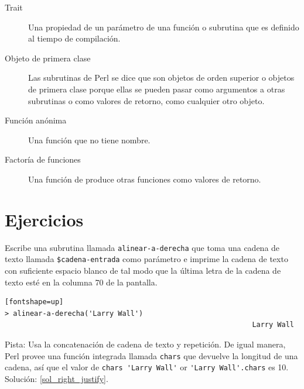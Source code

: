 \begin{description}
\item[Trait] Una propiedad de un parámetro de una función
o subrutina que es definido al tiempo de compilación.

\item[Objeto de primera clase] Las subrutinas de Perl se
dice que son objetos de orden superior o objetos de primera 
clase porque ellas se pueden pasar como argumentos a 
otras subrutinas o como valores de retorno, como cualquier
otro objeto.

\item[Función anónima] Una función que no tiene nombre.

\item[Factoría de funciones] Una función de produce otras 
funciones como valores de retorno.

\end{description}


\section{Ejercicios}

\begin{exercise}
\label{right_justify}

Escribe una subrutina llamada \verb|alinear-a-derecha| 
que toma una cadena de texto llamada {\tt \$cadena-entrada}
como parámetro e imprime la cadena de texto con suficiente
espacio blanco de tal modo que la última letra de la cadena
de texto esté en la columna 70 de la pantalla.

\begin{verbatim}[fontshape=up]
> alinear-a-derecha('Larry Wall')
                                                           Larry Wall
\end{verbatim}

Pista: Usa la concatenación de cadena de texto y repetición. 
De igual manera, Perl provee una función integrada llamada 
{\tt chars} que devuelve la longitud de una cadena, así que
el valor de \verb"chars 'Larry Wall'" or \verb"'Larry Wall'.chars"
es 10. Solución: \ref{sol_right_justify}.

\end{exercise}


